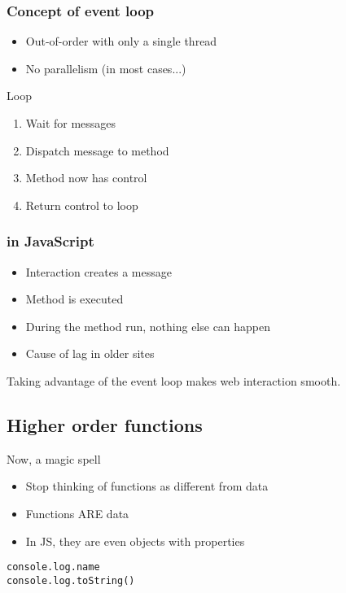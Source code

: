 \documentclass{beamer}
\begin{document}
\begin{frame}
	\frametitle{Concept of event loop}
	\begin{itemize}
		\item Out-of-order with only a single thread
		\item No parallelism (in most cases...)
	\end{itemize}
	\begin{alertblock}{Loop}
		\begin{enumerate}
			\item Wait for messages
			\item Dispatch message to method
			\item Method now has control
			\item Return control to loop
		\end{enumerate}
	\end{alertblock}
\end{frame}

\begin{frame}
	\frametitle{in JavaScript}
	\begin{itemize}
		\item Interaction creates a message
		\item Method is executed
		\item During the method run, \alert{nothing else can happen}
		\item Cause of lag in older sites
	\end{itemize}
	Taking advantage of the event loop makes web interaction smooth.
\end{frame}

\subsection{Higher order functions}
\begin{frame}[fragile]{Now, a magic spell}
	\begin{itemize}
		\item Stop thinking of functions as different from data
		\item Functions ARE data
		\item In JS, they are even objects with properties
	\end{itemize}
\begin{example}
\begin{verbatim}
console.log.name
console.log.toString()
\end{verbatim}
\end{example}
\end{frame}
\end{document}
